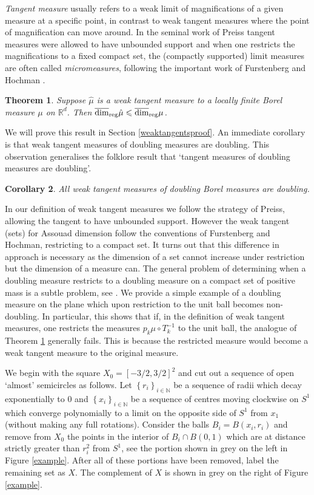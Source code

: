 \documentclass[12pt]{amsart}
\numberwithin{equation}{section}
\newtheorem{thm}{Theorem}[section]
\newtheorem{cor}[thm]{Corollary}
\renewcommand{\le}{\leqslant}
\renewcommand{\r}{\overline{\dim}_{\textup{reg}} \mu}
\begin{document}
\emph{Tangent measure} usually refers to a weak limit of magnifications of a given measure at a specific point, in contrast to weak tangent measures where the point of magnification can move around.   In the seminal work of Preiss \cite{preiss} tangent measures were allowed to have unbounded support and when one restricts the magnifications to a fixed compact set, the (compactly supported)  limit measures are  often called \emph{micromeasures}, following the important work of Furstenberg \cite{furstenberg} and Hochman \cite{hochman}.  

\begin{thm}\label{weaktangents}
Suppose $\hat{\mu}$ is a weak tangent measure to a locally finite Borel measure  $\mu$ on $\mathbb{R}^d$.  Then $\overline{\dim}_{\textup{reg}} \hat{\mu} \le \r $.
\end{thm}

We will prove this result in Section \ref{weaktangentsproof}.  An immediate corollary  is that weak tangent measures of doubling measures are doubling.  This observation generalises the folklore result that `tangent measures of doubling measures are doubling'.  

\begin{cor}
All weak tangent measures of  doubling Borel measures are doubling.
\end{cor}

In our definition of weak tangent measures we follow the strategy of Preiss, allowing the tangent to have unbounded support. However the weak tangent (sets) for Assouad dimension follow the conventions of Furstenberg and Hochman, restricting to a compact set. It turns out that this difference in approach is necessary as the dimension of a set cannot increase under restriction but the dimension of a measure can. The general problem of determining when a doubling measure restricts to a doubling measure on a compact set of positive mass is a subtle problem, see \cite{ojala}.  We provide a simple example of a doubling measure on the plane which upon restriction to the unit ball becomes non-doubling.  In particular, this shows that if, in the definition of weak tangent measures, one restricts the measures $p_k \mu \circ T^{-1}_k$ to the unit ball, the analogue of Theorem \ref{weaktangents} generally fails. This is because the restricted measure would become a weak tangent measure to the original measure.

We begin with the square $X_0 = [-3/2, 3/2]^2$ and cut out a sequence of open   `almost' semicircles as follows.   Let $\left\{r_i \right\}_{i\in \mathbb{N}}$ be a sequence of radii which decay exponentially to 0 and $\left\{x_i\right\}_{i\in \mathbb{N}}$ be a sequence of centres moving clockwise on  $S^1$ which converge polynomially to a limit on the opposite side of $S^1$ from $x_1$ (without making any full rotations). Consider the balls $B_i = B(x_i, r_i)$ and remove from $X_0$ the points in the interior of  $B_i \cap B(0,1)$ which are at distance strictly greater than $r_i^2$ from $S^1$, see the portion shown in grey on the left in Figure \ref{example}.  After all of these portions have been removed, label the remaining set as $X$.  The complement of $X$ is shown in grey on the right of Figure \ref{example}. 
\end{document}
